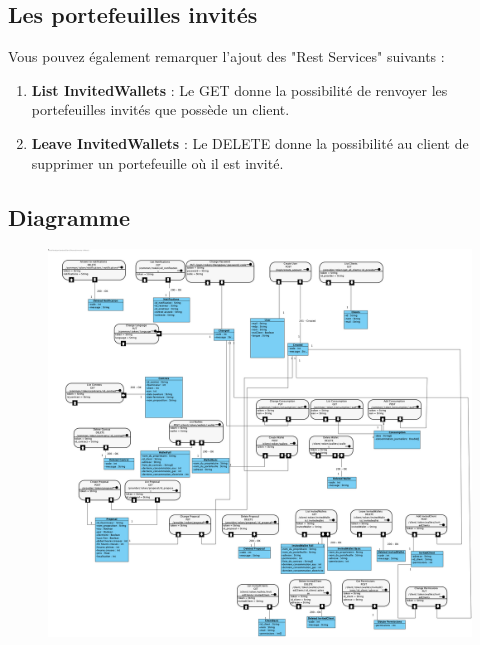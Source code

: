 \subsection{Les portefeuilles invités}
\begin{flushleft}
Vous pouvez également remarquer l'ajout des "Rest Services" suivants :
\end{flushleft}
\begin{enumerate}
\item \textbf{List InvitedWallets} :\newline
Le GET donne la possibilité de renvoyer les portefeuilles invités que possède un client.
\item \textbf{Leave InvitedWallets} :\newline
Le DELETE donne la possibilité au client de supprimer un portefeuille où il est invité.
\end{enumerate}


\newpage
\subsection{Diagramme}
\begin{figure}[h]
\centering
\includegraphics[width = 1\textwidth]{Extension-claire/API-claire/img/API-claire.png}
\end{figure}